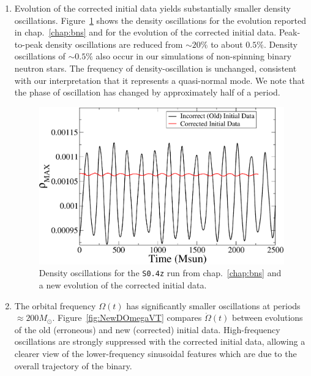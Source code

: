 \begin{subappendices}
\begin{enumerate}
\item Evolution of the corrected initial data yields substantially
  smaller density oscillations. Figure~\ref{fig:NewS4Density} shows the
density oscillations for the evolution reported in chap.~\ref{chap:bns}
and for the evolution of the corrected initial data.  Peak-to-peak
density oscillations are reduced from $\sim 20\%$ to about $0.5\%$.
Density oscillations of $\sim 0.5\%$ also occur in our simulations of
non-spinning binary neutron stars.
The frequency of density-oscillation is
unchanged, consistent with our interpretation that it represents a
quasi-normal mode. We note that the phase of oscillation has changed
by approximately half of a period.

\begin{figure}
\includegraphics[width=0.95\columnwidth]{chap2/NewS4Density}
\caption[Density oscillations with corrected initial data.]{\label{fig:NewS4Density}Density oscillations for
  the {\tt S0.4z} run from chap.~\ref{chap:bns} and a new evolution of
  the corrected initial data.
}
\end{figure}

\item 
The orbital frequency $\Omega(t)$ has significantly
  smaller oscillations at periods $\approx 200M_{\odot}$.
Figure~\ref{fig:NewDOmegaVT} compares $\dot{\Omega}(t)$ between evolutions of the old (erroneous) and
new (corrected) initial data.  High-frequency oscillations are strongly suppressed with the
corrected initial data, allowing a clearer view of the lower-frequency
sinusoidal features which are due to the overall trajectory of the
binary. 



\end{enumerate}
\end{subappendices}
